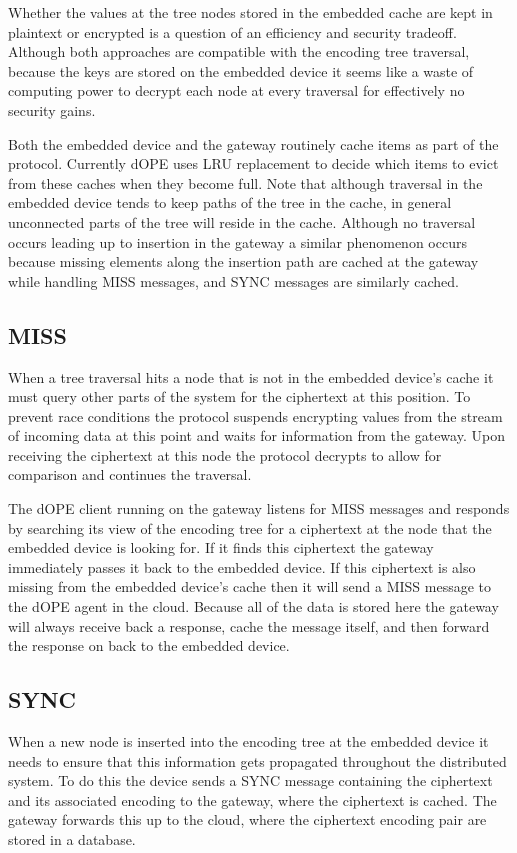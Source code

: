 \documentclass[12pt]{article}
\begin{document}
Whether the values at the tree nodes stored in the embedded cache are kept in plaintext or encrypted is a question of an efficiency and security tradeoff.  Although both approaches are compatible with the encoding tree traversal, because the keys are stored on the embedded device it seems like a waste of computing power to decrypt each node at every traversal for effectively no security gains.

Both the embedded device and the gateway routinely cache items as part of the protocol.  Currently dOPE uses LRU replacement to decide which items to evict from these caches when they become full.  Note that although traversal in the embedded device tends to keep paths of the tree in the cache, in general unconnected parts of the tree will reside in the cache.  Although no traversal occurs leading up to insertion in the gateway a similar phenomenon occurs because missing elements along the insertion path are cached at the gateway while handling MISS messages, and SYNC messages are similarly cached.

\subsection{MISS}
When a tree traversal hits a node that is not in the embedded device's cache it must query other parts of the system for the ciphertext at this position.  To prevent race conditions the protocol suspends encrypting values from the stream of incoming data at this point and waits for information from the gateway.  Upon receiving the ciphertext at this node the protocol decrypts to allow for comparison and continues the traversal.

The dOPE client running on the gateway listens for MISS messages and responds by searching its view of the encoding tree for a ciphertext at the node that the embedded device is looking for.  If it finds this ciphertext the gateway immediately passes it back to the embedded device.  If this ciphertext is also missing from the embedded device's cache then it will send a MISS message to the dOPE agent in the cloud.  Because all of the data is stored here the gateway will always receive back a response, cache the message itself, and then forward the response on back to the embedded device.

\subsection{SYNC}
When a new node is inserted into the encoding tree at the embedded device it needs to ensure that this information gets propagated throughout the distributed system.  To do this the device sends a SYNC message containing the ciphertext and its associated encoding to the gateway, where the ciphertext is cached.  The gateway forwards this up to the cloud, where the ciphertext encoding pair are stored in a database.
\end{document}
